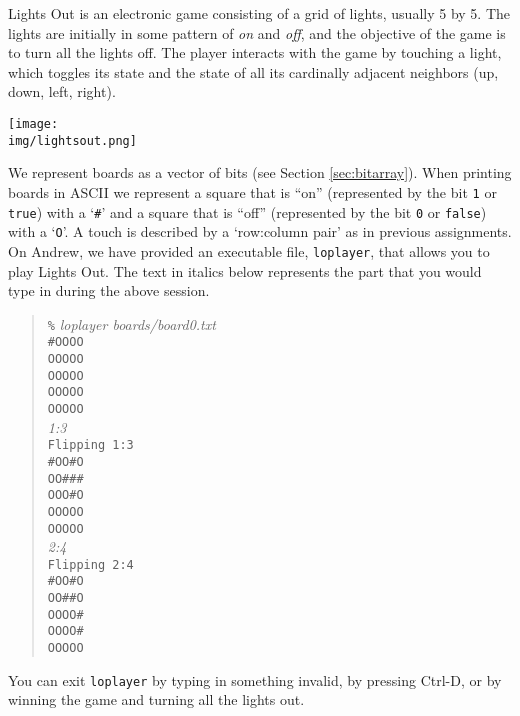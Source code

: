 \documentclass[12pt]{exam}
\begin{document}
Lights Out is an electronic game consisting of a grid of lights,
usually 5 by 5. The lights are initially in some pattern of \emph{on}
and \emph{off}, and the objective of the game is to turn all the
lights off.  The player interacts with the game by touching a light,
which toggles its state and the state of all its cardinally adjacent
neighbors (up, down, left, right).
\begin{center}
  \hspace*{2em}\texttt{[image: \\img/lightsout.png]}
\end{center}
We represent boards as a vector of bits (see Section
\ref{sec:bitarray}). When printing boards in ASCII we represent a
square that is ``on'' (represented by the bit \lstinline'1' or
\lstinline'true') with a `\lstinline"#"' and a square that is ``off''
(represented by the bit \lstinline'0' or \lstinline'false') with a
`\lstinline"O"'. A touch is described by a `row:column pair' as in
previous assignments. On Andrew, we have provided an executable file,
\lstinline'loplayer', that allows you to play Lights Out. The text in
italics below represents the part that you would type in during the above
session.
\begin{quote}
\lstinline'%' \emph{loplayer boards/board0.txt}\\
\lstinline'#OOOO'\\
\lstinline'OOOOO'\\
\lstinline'OOOOO'\\
\lstinline'OOOOO'\\
\lstinline'OOOOO'\\
\emph{1:3}\\
\lstinline'Flipping 1:3'\\
\lstinline'#OO#O'\\
\lstinline'OO###'\\
\lstinline'OOO#O'\\
\lstinline'OOOOO'\\
\lstinline'OOOOO'\\
\emph{2:4}\\
\lstinline'Flipping 2:4'\\
\lstinline'#OO#O'\\
\lstinline'OO##O'\\
\lstinline'OOOO#'\\
\lstinline'OOOO#'\\
\lstinline'OOOOO'
\end{quote}
You can exit \lstinline'loplayer' by typing in something invalid, by
pressing Ctrl-D, or by winning the game and turning all the lights
out.
\end{document}
